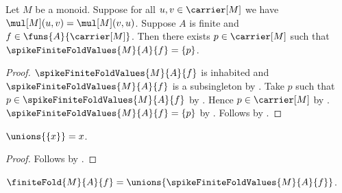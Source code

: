 \begin{theorem}\label{spike_finite_fold_values_singleton}
    Let $M$ be a monoid.
    Suppose for all $u,v\in\carrier[M]$ we have
        $\mul[M](u,v)=\mul[M](v,u)$.
    Suppose $A$ is finite and $f\in\funs{A}{\carrier[M]}$.
    Then there exists $p\in\carrier[M]$ such that
        $\spikeFiniteFoldValues{M}{A}{f}=\{p\}$.
\end{theorem}
\begin{proof}
    $\spikeFiniteFoldValues{M}{A}{f}$ is inhabited and
        $\spikeFiniteFoldValues{M}{A}{f}$ is a subsingleton by
        .
    Take $p$ such that
        $p\in\spikeFiniteFoldValues{M}{A}{f}$ by \auto.
    Hence $p\in\carrier[M]$ by
        .
    $\spikeFiniteFoldValues{M}{A}{f}=\{p\}$ by
        .
    Follows by \auto.
\end{proof}

\begin{proposition}\label{spike_unions_singleton}
    $\unions{\{x\}}=x$.
\end{proposition}
\begin{proof}
    Follows by .
\end{proof}

\begin{definition}\label{spike_finite_fold}
    $\finiteFold{M}{A}{f}=\unions{\spikeFiniteFoldValues{M}{A}{f}}$.
\end{definition}

